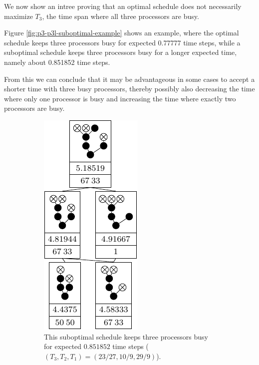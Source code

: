 We now show an intree proving that an optimal schedule does not necessarily maximize $T_3$, the time span where all three processors are busy.

Figure \ref{fig:p3-p3l-suboptimal-example} shows an example, where the optimal schedule keeps three processors busy for expected 0.77777 time steps, while a suboptimal schedule keeps three processors busy for a longer expected time, namely about 0.851852 time steps.

From this we can conclude that it may be advantageous in some cases to accept a shorter time with three busy processors, thereby possibly also decreasing the time where only one processor is busy and increasing the time where exactly two processors are busy.

\begin{figure}[ht]
  \centering
  \begin{subfigure}{.45\linewidth}
    \centering
    \includegraphics{p3/keep_3_busy/three_busy_subopt.pdf}
    \caption{This suboptimal schedule keeps three processors busy for expected $0.851852$ time steps ($(T_3, T_2, T_1)=(23/27,10/9,29/9)$).}
  \end{subfigure}
  \quad
  \begin{subfigure}{.45\linewidth}
    \centering

\end{subfigure}
\end{figure}
